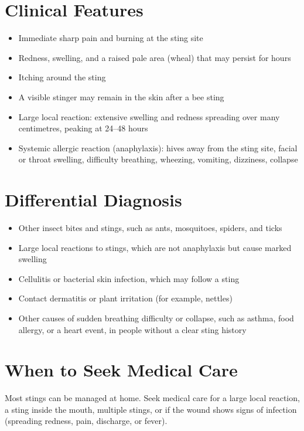 \section*{Clinical Features}
\begin{itemize}
    \item Immediate sharp pain and burning at the sting site
    \item Redness, swelling, and a raised pale area (wheal) that may persist for hours
    \item Itching around the sting
    \item A visible stinger may remain in the skin after a bee sting
    \item Large local reaction: extensive swelling and redness spreading over many centimetres, peaking at 24--48 hours
    \item Systemic allergic reaction (anaphylaxis): hives away from the sting site, facial or throat swelling, difficulty breathing, wheezing, vomiting, dizziness, collapse
\end{itemize}

\section*{Differential Diagnosis}
\begin{itemize}
    \item Other insect bites and stings, such as ants, mosquitoes, spiders, and ticks
    \item Large local reactions to stings, which are not anaphylaxis but cause marked swelling
    \item Cellulitis or bacterial skin infection, which may follow a sting
    \item Contact dermatitis or plant irritation (for example, nettles)
    \item Other causes of sudden breathing difficulty or collapse, such as asthma, food allergy, or a heart event, in people without a clear sting history
\end{itemize}

\section*{When to Seek Medical Care}
Most stings can be managed at home. Seek medical care for a large local reaction, a sting inside the mouth, multiple stings, or if the wound shows signs of infection (spreading redness, pain, discharge, or fever).

